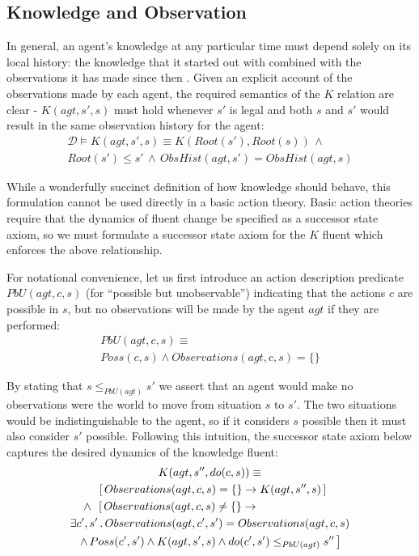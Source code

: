 \documentclass{ifaamas-submission}
\begin{document}
\subsection{Knowledge and Observation}

In general, an agent's knowledge at any particular time must depend
solely on its local history: the knowledge that it started out with
combined with the observations it has made since then \cite{halpern90knowledge_distrib}.
Given an explicit account of the observations made by each agent,
the required semantics of the $K$ relation are clear - $K(agt,s',s)$
must hold whenever $s'$ is legal and both $s$ and $s'$ would result
in the same observation history for the agent:\begin{multline*}
\mathcal{D}\models K(agt,s',s)\equiv K(Root(s'),Root(s))\,\wedge\\
Root(s')\leq s'\,\wedge\, ObsHist(agt,s')=ObsHist(agt,s)\end{multline*}


While a wonderfully succinct definition of how knowledge should behave,
this formulation cannot be used directly in a basic action theory.
Basic action theories require that the dynamics of fluent change be
specified as a successor state axiom, so we must formulate a successor
state axiom for the $K$ fluent which enforces the above relationship.

For notational convenience, let us first introduce an action description
predicate $PbU(agt,c,s)$ (for {}``possible but unobservable'')
indicating that the actions $c$ are possible in $s$, but no observations
will be made by the agent $agt$ if they are performed:\begin{multline}
PbU(agt,c,s)\equiv\\
Poss(c,s)\wedge Observations(agt,c,s)=\{\}\label{eq:PbU_defn}\end{multline}


By stating that $s\leq_{PbU(agt)}s'$ we assert that an agent would
make no observations were the world to move from situation $s$ to
$s'$. The two situations would be indistinguishable to the agent,
so if it considers $s$ possible then it must also consider $s'$
possible. Following this intuition, the successor state axiom below
captures the desired dynamics of the knowledge fluent:\begin{multline}
K(agt,s'',do(c,s))\equiv\\
\shoveleft{\,\,\,\,\,\,\,\,\,\,\left[\, Observations(agt,c,s)=\{\}\rightarrow K(agt,s'',s)\,\right]}\\
\shoveleft{\,\,\wedge\,\,\,\left[\, Observations(agt,c,s)\neq\{\}\rightarrow\right.}\\
\exists c',s'\,.\, Observations(agt,c',s')=Observations(agt,c,s)\\
\left.\wedge\, Poss(c',s')\wedge K(agt,s',s)\wedge do(c',s')\leq_{PbU(agt)}s''\,\right]\label{eqn:new_k_ssa}\end{multline}
 
\end{document}
